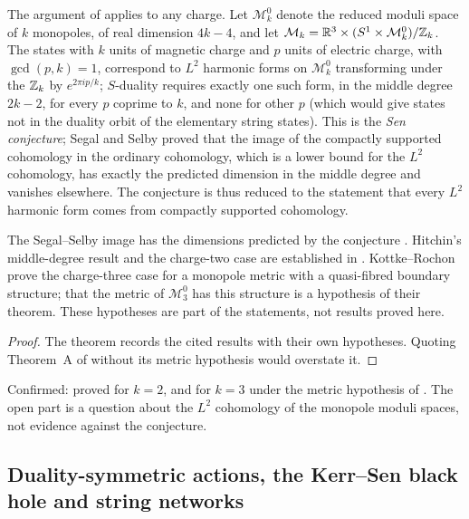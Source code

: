 The argument of \cite{Sen94dyon} applies to any charge. Let $\mathcal M_k^0$ denote the reduced moduli space of $k$ monopoles, of real dimension $4k-4$, and let $\mathcal M_k = \mathbb{R}^3\times(S^1\times\mathcal M^0_k)/\mathbb{Z}_k$. The states with $k$ units of magnetic charge and $p$ units of electric charge, with $\gcd(p,k)=1$, correspond to $L^2$ harmonic forms on $\mathcal M^0_k$ transforming under the $\mathbb{Z}_k$ by $e^{2\pi i p/k}$; $S$-duality requires exactly one such form, in the middle degree $2k-2$, for every $p$ coprime to $k$, and none for other $p$ (which would give states not in the duality orbit of the elementary string states). This is the \emph{Sen conjecture}; Segal and Selby \cite{SegalSelby96} proved that the image of the compactly supported cohomology in the ordinary cohomology, which is a lower bound for the $L^2$ cohomology, has exactly the predicted dimension in the middle degree and vanishes elsewhere. The conjecture is thus reduced to the statement that every $L^2$ harmonic form comes from compactly supported cohomology.

\begin{theorem}\label{thm:senconj}
The Segal--Selby image has the dimensions predicted by the conjecture \cite{SegalSelby96}. Hitchin's middle-degree result and the charge-two case are established in \cite{Hitchin00}. Kottke--Rochon \cite[Theorem~A]{KottkeRochon24} prove the charge-three case for a monopole metric with a quasi-fibred boundary structure; that the metric of $\mathcal M^0_3$ has this structure is a hypothesis of their theorem. These hypotheses are part of the statements, not results proved here.
\end{theorem}
\begin{proof}
The theorem records the cited results with their own hypotheses. Quoting Theorem~A of \cite{KottkeRochon24} without its metric hypothesis would overstate it.
\end{proof}
\begin{verdict}[claim 3]
Confirmed: proved for $k=2$, and for $k=3$ under the metric hypothesis of \cite{KottkeRochon24}.  The open part is a question about the $L^2$ cohomology of the monopole moduli spaces, not evidence against the conjecture.
\end{verdict}

\subsection{Duality-symmetric actions, the Kerr--Sen black hole and string networks}\label{ssec:misc}

